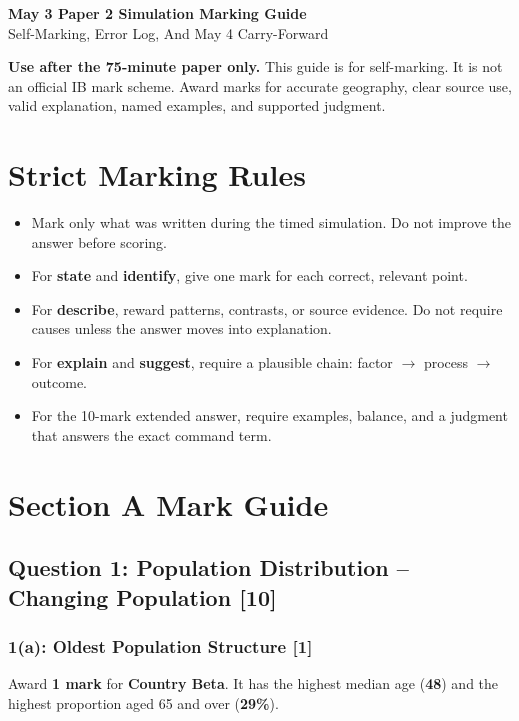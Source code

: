 \documentclass[11pt,a4paper]{article}
\newcommand{\term}[1]{\textcolor{HeadingBlue}{\textbf{#1}}}
\newcommand{\exam}[1]{\textcolor{AccentTeal}{\textbf{#1}}}
\newcommand{\score}[1]{\textcolor{AccentTeal}{\textbf{#1}}}
\newcommand{\boxnote}[3]{%
\noindent\colorbox{#1}{%
  \begin{minipage}{0.965\textwidth}
  \sffamily
  \textbf{\textcolor{HeadingBlue}{#2}} #3
  \end{minipage}
}}
\begin{document}
\begin{center}
  {\sffamily\bfseries\color{HeadingBlue}\LARGE May 3 Paper 2 Simulation Marking Guide}\\[0.25em]
  {\sffamily\color{AccentTeal}\large Self-Marking, Error Log, And May 4 Carry-Forward}
\end{center}

\boxnote{SoftRed}{Use after the 75-minute paper only.}{This guide is for
self-marking. It is not an official IB mark scheme. Award marks for accurate
geography, clear source use, valid explanation, named examples, and supported
judgment.}

\section{Strict Marking Rules}

\begin{itemize}
  \item Mark only what was written during the timed simulation. Do not improve
  the answer before scoring.
  \item For \exam{state} and \exam{identify}, give one mark for each correct,
  relevant point.
  \item For \exam{describe}, reward patterns, contrasts, or source evidence.
  Do not require causes unless the answer moves into explanation.
  \item For \exam{explain} and \exam{suggest}, require a plausible chain:
  factor $\rightarrow$ process $\rightarrow$ outcome.
  \item For the 10-mark extended answer, require examples, balance, and a
  judgment that answers the exact command term.
\end{itemize}

\section{Section A Mark Guide}

\subsection{Question 1: Population Distribution -- Changing Population [10]}

\subsubsection{1(a): Oldest Population Structure [1]}

Award \score{1 mark} for \term{Country Beta}. It has the highest median age
(\term{48}) and the highest proportion aged 65 and over (\term{29\%}).
\end{document}
